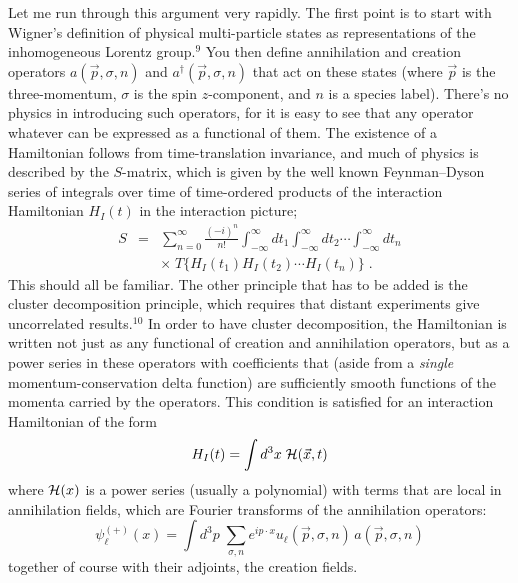 Let me run through this argument very rapidly.  The first
point is to start with Wigner's definition of physical
multi-particle states as representations of the
inhomogeneous Lorentz group.$^9$  You then define
annihilation
and creation operators $a(\vec{p},\sigma,n)$ and
$a^\dagger(\vec{p},\sigma,n)$ that act on these states
(where $\vec{p}$ is the three-momentum, $\sigma$ is the spin
$z$-component, and $n$ is a species label).   There's no
physics in introducing such operators, for it is easy to see
that any operator whatever can be expressed as a functional
of them.  The existence of a Hamiltonian follows from
time-translation invariance, and much of physics is
described by
the $S$-matrix, which is given by the well known
Feynman--Dyson series of integrals over time of time-ordered
products of the interaction Hamiltonian $H_I(t)$  in the
interaction picture;
\begin{eqnarray} S&=&\sum_{n=0}^\infty\frac{(-
i)^n}{n!}\int_{-\infty}^\infty dt_1
\int_{-\infty}^\infty dt_2\cdots \int_{-\infty}^\infty dt_n
\nonumber\\&&\times\;
T\{H_I(t_1)H_I(t_2)\cdots H_I(t_n)\}\;.
\end{eqnarray}
This should all be familiar.    The other principle that has
to be added is the cluster decomposition principle, which
requires that distant experiments give uncorrelated
results.$^{10}$
In order to have cluster decomposition, the Hamiltonian is
written not just as any functional of creation and
annihilation operators, but as a power series in these
operators with coefficients that (aside from a {\em single}
momentum-conservation delta function) are sufficiently
smooth functions of the momenta carried by the operators.
This condition is satisfied for an interaction Hamiltonian
of the  form
\begin{equation}
H_I(t)=\int d^3x\; {\cal H}(\vec{x},t)
\end{equation}
where ${\cal H}(x)$ is a power series (usually a polynomial)
with terms that are local in annihilation fields, which are
Fourier transforms of the annihilation operators:
\begin{equation} \psi^{(+)}_\ell(x)= \int
d^3p\;\sum_{\sigma,n} e^{ip\cdot x }u_\ell({\vec
p},\sigma,n)\,a({\vec p},\sigma,n)
\end{equation}
together of course with their adjoints, the creation fields.

